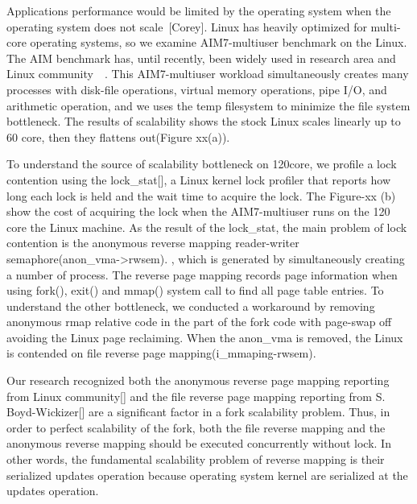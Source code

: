 Applications performance would be limited by the operating system when the
operating system does not scale~\cite{Clements15SCR}[Corey].
Linux has heavily optimized for multi-core operating systems, so we examine
AIM7-multiuser benchmark on the Linux.
The AIM benchmark has, until recently, been widely used in research area
and Linux community~\cite{Bueso2015STP}~\cite{Bueso2014MCS}.
This AIM7-multiuser workload simultaneously creates many processes with
disk-file operations, virtual memory operations, pipe I/O, and arithmetic
operation, and we uses the temp filesystem to minimize the file system
bottleneck.
The results of scalability shows the stock Linux scales linearly up to 60 core,
then they flattens out(Figure xx(a)).


To understand the source of scalability bottleneck on 120core, we profile a lock
contention using the lock\_stat[], a Linux kernel lock profiler that reports how
long each lock is held and the wait time to acquire the lock.
The Figure-xx (b) show the cost of acquiring the lock when the AIM7-multiuser
runs on the 120 core the Linux machine.
As the result of the lock\_stat, the main problem of lock contention is the
anonymous reverse mapping reader-writer semaphore(anon\_vma->rwsem).
, which is generated by simultaneously creating a number of process.
The reverse page mapping records page information when using fork(), exit() and
mmap() system call to find all page table entries.
To understand the other bottleneck, we conducted a workaround by removing
anonymous rmap relative code in the part of the fork code with page-swap off
avoiding the Linux page reclaiming.
When the anon\_vma is removed, the Linux is contended on file reverse page
mapping(i\_mmaping-rwsem).


Our research recognized both the anonymous reverse page mapping
reporting from Linux community[] and the file reverse page mapping reporting from S.
Boyd-Wickizer[] are a significant factor in a fork scalability problem.
Thus, in order to perfect scalability of the fork, both the
file reverse mapping and the anonymous reverse mapping should be executed
concurrently without lock.
In other words, the fundamental scalability problem of reverse mapping is their
serialized updates operation because operating system kernel are serialized at
the updates operation.

